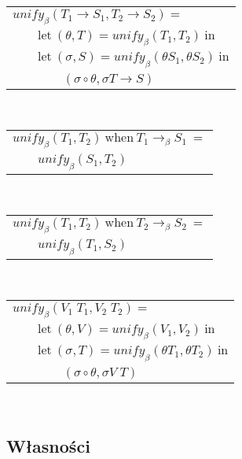 \documentclass[11pt,leqno]{article}
\begin{document}
\begin{tabular}{l}
$unify_\beta(T_1 \rightarrow S_1, T_2 \rightarrow S_2) = $ \\
$\qquad \textrm{let} \ (\theta, T) = unify_\beta(T_1, T_2) \ \textrm{in} $ \\
$\qquad \textrm{let} \ (\sigma, S) = unify_\beta(\theta S_1, \theta S_2) \ \textrm{in} $ \\
$\qquad\qquad (\sigma \circ \theta, \sigma T \rightarrow S) $ \\
\end{tabular} \\
\begin{tabular}{l}
$unify_\beta(T_1, T_2) \ \textrm{when} \ T_1 \longrightarrow_\beta S_1 \ = $ \\
$\qquad unify_\beta(S_1, T_2)$ \\
\end{tabular} \\
\begin{tabular}{l}
$unify_\beta(T_1, T_2) \ \textrm{when} \ T_2 \longrightarrow_\beta S_2 \ = $ \\
$\qquad unify_\beta(T_1, S_2)$ \\
\end{tabular} \\
\begin{tabular}{l}
$unify_\beta(V_1 \; T_1, V_2 \; T_2) = $ \\
$\qquad \textrm{let} \ (\theta, V) = unify_\beta(V_1, V_2) \ \textrm{in} $ \\
$\qquad \textrm{let} \ (\sigma, T) = unify_\beta(\theta T_1, \theta T_2) \ \textrm{in} $ \\
$\qquad\qquad (\sigma \circ \theta, \sigma V \; T) $ \\
\end{tabular} \\

\subsection{Własności}
\end{document}
